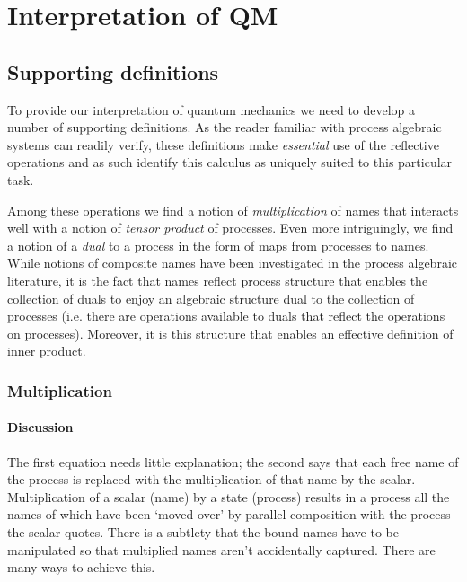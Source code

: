 \section{Interpretation of QM}
\subsection{Supporting definitions}

To provide our interpretation of quantum mechanics we need to develop
a number of supporting definitions. As the reader familiar with
process algebraic systems can readily verify, these definitions make
\emph{essential} use of the reflective operations and as such identify
this calculus as uniquely suited to this particular task.

Among these operations we find a notion of \emph{multiplication} of
names that interacts well with a notion of \emph{tensor product} of
processes. Even more intriguingly, we find a notion of a \emph{dual}
to a process in the form of maps from processes to names. While
notions of composite names have been investigated in the process
algebraic literature, it is the fact that names reflect process
structure that enables the collection of duals to enjoy an algebraic
structure dual to the collection of processes (i.e. there are
operations available to duals that reflect the operations on
processes). Moreover, it is this structure that enables an effective
definition of inner product.

\subsubsection{Multiplication}

\paragraph{Discussion}
The first equation needs little explanation; the second says that each
free name of the process is replaced with the multiplication of that
name by the scalar. Multiplication of a scalar (name) by a state
(process) results in a process all the names of which have been `moved
over' by parallel composition with the process the scalar
quotes. There is a subtlety that the bound names have to be
manipulated so that multiplied names aren't accidentally
captured. There are many ways to achieve this.

